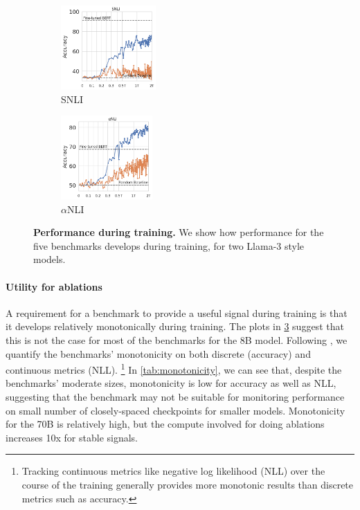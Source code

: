\begin{figure}[t]
\begin{subfigure}[b]{0.19\textwidth}
    \centering
    \includegraphics[height=3.2cm, trim=11mm 0 0 0, clip]{figures/snli_intermediate}
    \caption{SNLI}
    \label{fig:snli_int}
    \end{subfigure}
    \begin{subfigure}[b]{0.19\textwidth}
    \centering
    \includegraphics[height=3.2cm, trim=11mm 0 0 0, clip]{figures/abductivenli_intermediate}
    \caption{$\alpha$NLI}
    \label{fig:alphanli_int}
    \end{subfigure}
    \caption{\textbf{Performance during training.} We show how performance for the five benchmarks develops during training, for two Llama-3 style models.}\label{fig:performance_training}
\end{figure}

\paragraph{Utility for ablations}
A requirement for a benchmark to provide a useful signal during training is that it develops relatively monotonically during training.
The plots in \cref{fig:performance_training} suggest that this is not the case for most of the benchmarks for the 8B model.
Following \citet{variancepaper}, we quantify the benchmarks' monotonicity on both discrete (accuracy) and continuous metrics (NLL).%
\footnote{Tracking continuous metrics like negative log likelihood (NLL) over the course of the training generally provides more monotonic results than discrete metrics such as accuracy.}
In \cref{tab:monotonicity}, we can see that, despite the benchmarks' moderate sizes, monotonicity is low for accuracy as well as NLL, suggesting that the benchmark may not be suitable for monitoring performance on small number of closely-spaced checkpoints for smaller models. Monotonicity for the 70B is relatively high, but the compute involved for doing ablations increases 10x for stable signals.

